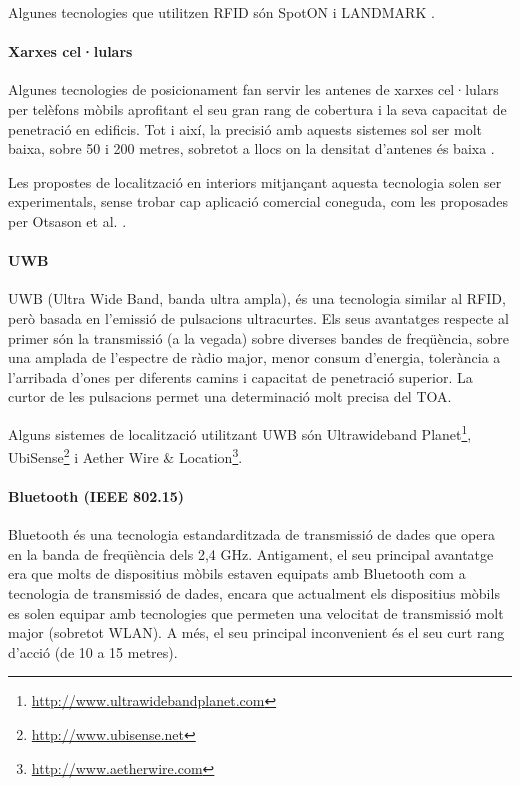 Algunes tecnologies que utilitzen RFID són SpotON \cite{hightower} i LANDMARK \cite{ni}.

\paragraph{Xarxes cel·lulars}

Algunes tecnologies de posicionament fan servir les antenes de xarxes cel·lulars per telèfons mòbils aprofitant el seu gran rang de cobertura i la seva capacitat de penetració en edificis. Tot i així, la precisió amb aquests sistemes sol ser molt baixa, sobre 50 i 200 metres, sobretot a llocs on la densitat d'antenes és baixa \cite{caffery}.

Les propostes de localització en interiors mitjançant aquesta tecnologia solen ser experimentals, sense trobar cap aplicació comercial coneguda, com les proposades per Otsason et al. \cite{otsason}.

\paragraph{UWB}

UWB (Ultra Wide Band, banda ultra ampla), és una tecnologia similar al RFID, però basada en l'emissió de pulsacions ultracurtes. Els seus avantatges respecte al primer són la transmissió (a la vegada) sobre diverses bandes de freqüència, sobre una amplada de l'espectre de ràdio major, menor consum d'energia, tolerància a l'arribada d'ones per diferents camins i capacitat de penetració superior. La curtor de les pulsacions permet una determinació molt precisa del TOA.

Alguns sistemes de localització utilitzant UWB són Ultrawideband Planet\footnote{\url{http://www.ultrawidebandplanet.com}}, UbiSense\footnote{\url{http://www.ubisense.net}} i Aether Wire \& Location\footnote{\url{http://www.aetherwire.com}}.

\paragraph{Bluetooth (IEEE 802.15)}

Bluetooth és una tecnologia estandarditzada de transmissió de dades que opera en la banda de freqüència dels 2,4 GHz. Antigament, el seu principal avantatge era que molts de dispositius mòbils estaven equipats amb Bluetooth com a tecnologia de transmissió de dades, encara que actualment els dispositius mòbils es solen equipar amb tecnologies que permeten una velocitat de transmissió molt major (sobretot WLAN). A més, el seu principal inconvenient és el seu curt rang d'acció (de 10 a 15 metres).

